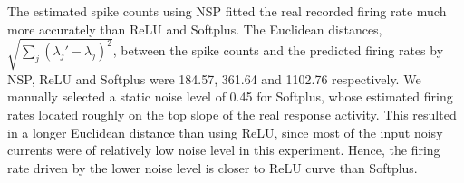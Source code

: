 	The estimated spike counts using NSP fitted the real recorded firing rate much more accurately than ReLU and Softplus.
	The Euclidean distances, $\sqrt{\sum_{j}(\lambda_j' - \lambda_j)^2}$, between the spike counts and the predicted firing rates by NSP, ReLU and Softplus were 184.57, 361.64 and 1102.76 respectively.
	We manually selected a static noise level of 0.45 for Softplus, whose estimated firing rates located roughly on the top slope of the real response activity.
	This resulted in a longer Euclidean distance than using ReLU, since most of the input noisy currents were of relatively low noise level in this experiment.
	Hence, the firing rate driven by the lower noise level is closer to ReLU curve than Softplus.
			
